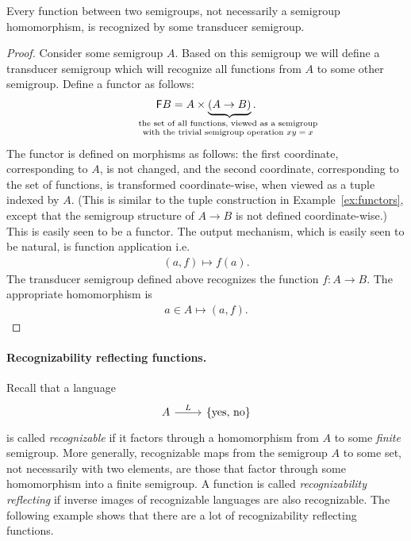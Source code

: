 \begin{theorem}\label{thm:all-functions} 
     Every function    between two semigroups, not necessarily a semigroup homomorphism, is recognized  by some transducer semigroup.
\end{theorem}
\begin{proof}
    Consider some semigroup $A$. Based on this semigroup we will define a transducer semigroup which will recognize all functions from $A$ to some other semigroup. Define  a functor as follows:
\begin{align*}
\functor B = A \times \myunderbrace{(A \to B)}{the set of all  functions, viewed as a semigroup \\ 
with the trivial semigroup operation $xy = x$}.
\end{align*}
The functor is defined on morphisms
as follows: the first coordinate, corresponding to $A$, is not changed, and the second coordinate, corresponding to the set of functions, is transformed   coordinate-wise, when viewed as a tuple indexed by $A$. (This is similar to the tuple construction in Example~\ref{ex:functors}, except that the semigroup structure of $A \to B$ is not defined coordinate-wise.)  This is easily seen to be a functor. 
The output mechanism, which is easily seen to be natural, is function application i.e.
\begin{align*}
    (a,f) \mapsto f(a).
\end{align*}
The transducer semigroup defined above recognizes the function $f : A \to B$. The appropriate homomorphism  is 
\begin{align*}
a \in A  \mapsto  (a,f).
\end{align*} 
\end{proof}

\paragraph*{Recognizability reflecting functions.} Recall that a language 
\[
\begin{tikzcd}
A 
\ar[r,"L"]
&
\set{\text{yes, no}}
\end{tikzcd}
\]
is called \emph{recognizable} if it factors through a homomorphism from $A$ to some \emph{finite} semigroup.  More generally, recognizable maps from the semigroup $A$ to some set, not necessarily with two elements, are those that factor through some homomorphism into a finite semigroup. A function is called \emph{recognizability reflecting} if  
inverse images of recognizable languages are also recognizable. The following example shows that there are a lot of recognizability reflecting functions.

